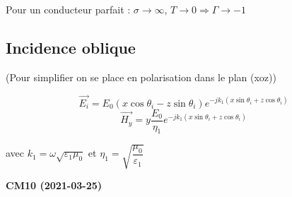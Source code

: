 \documentclass[12pt,a4paper]{report}
\begin{document}
Pour un conducteur parfait : \(\sigma \rightarrow \infty\), \(T \rightarrow 0 \Rightarrow \Gamma \rightarrow -1\)

\subsection{Incidence oblique}

(Pour simplifier on se place en polarisation dans le plan (xoz))

\[
	\vec{E_i} = E_0 ( x \cos \theta_i - z \sin \theta_i) e^{-jk_1 (x\sin\theta_i + z\cos\theta_i)}
\]
\[
	\vec{H_y} = y \dfrac{E_0}{\eta_1} e^{-jk_1 (x \sin \theta_i + z\cos \theta_i)}
\]

avec \(k_1 = \omega \sqrt{\varepsilon_1 \mu_0}\) et \(\eta_1 = \sqrt{\dfrac{\mu_0}{\varepsilon_1}}\)

\begin{center}
\textbf{CM10 (2021-03-25)}
\end{center}
\end{document}
